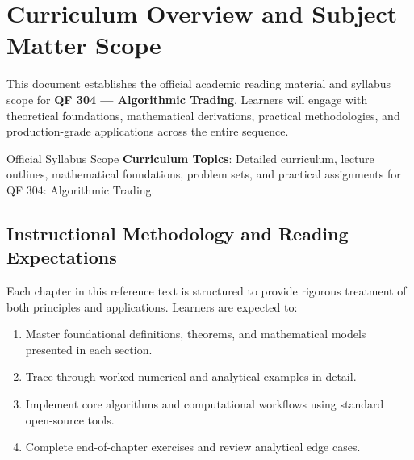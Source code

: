 \section{Curriculum Overview and Subject Matter Scope}

This document establishes the official academic reading material and syllabus scope for \textbf{QF 304 --- Algorithmic Trading}. Learners will engage with theoretical foundations, mathematical derivations, practical methodologies, and production-grade applications across the entire sequence.

\begin{InsightBox}{Official Syllabus Scope}
  \textbf{Curriculum Topics}: Detailed curriculum, lecture outlines, mathematical foundations, problem sets, and practical assignments for QF 304: Algorithmic Trading.
\end{InsightBox}

\subsection{Instructional Methodology and Reading Expectations}

Each chapter in this reference text is structured to provide rigorous treatment of both principles and applications. Learners are expected to:
\begin{enumerate}
  \item Master foundational definitions, theorems, and mathematical models presented in each section.
  \item Trace through worked numerical and analytical examples in detail.
  \item Implement core algorithms and computational workflows using standard open-source tools.
  \item Complete end-of-chapter exercises and review analytical edge cases.
\end{enumerate}

